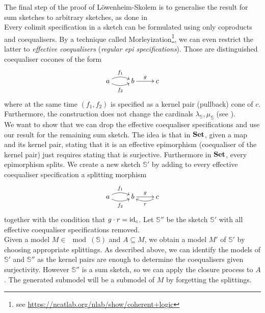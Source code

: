 The final step of the proof of Löwenheim-Skolem is to generalise the result for sum sketches to arbitrary sketches, as done in \cite[55]{MakkaiPare} \\

Every colimit specification in a sketch can be formulated using only coproducts and coequalisers. By a technique called Morleyization\footnote{see \url{https://ncatlab.org/nlab/show/coherent+logic}}, we can even restrict the latter to \emph{effective coequalisers} (\emph{regular epi specifications}). Those are distinguished coequaliser cocones of the form
\[
\xymatrix{
a \ar@/^/[r]^{f_1} \ar@/_/[r]_{f_2} & b \ar[r]^{g} & c
}\]
where at the same time $(f_1,f_2)$ is specified as a kernel pair (pullback) cone of $c$. Furthermore, the construction does not change the cardinals $\lambda_\mathbb S, \mu_\mathbb S$ (see \cite[\nopp~3.2.4, \nopp~3.2.7]{MakkaiPare}). \\

We want to show that we can drop the effective coequaliser specifications and use our result for the remaining sum sketch. The idea is that in $\mathbf{Set}$, given a map and its kernel pair, stating that it is an effective epimorphism (coequaliser of the kernel pair) just requires stating that is surjective. Furthermore in $\mathbf{Set}$, every epimorphism splits. We create a new sketch $\mathbb S'$ by adding to every effective coequaliser specification a splitting morphism
\[
\xymatrix{
a \ar@/^/[r]^{f_1} \ar@/_/[r]_{f_2} & b \ar[r]^{g} & c \ar@/^/[l]^{r}
}\]
together with the condition that $g \cdot r = \textrm{id}_c$. Let $\mathbb S''$ be the sketch $\mathbb S'$ with all effective coequaliser specifications removed. \\

Given a model $M \in \mod(\mathbb S)$ and $A \subseteq M$, we obtain a model $M'$ of $\mathbb S'$ by choosing appropriate splittings. As described above, we can identify the models of $\mathbb S'$ and $\mathbb S''$ as the kernel pairs are enough to determine the coequalisers given surjectivity. However $\mathbb S''$ is a sum sketch, so we can apply the closure process to $A$. The generated submodel will be a submodel of $M$ by forgetting the splittings.